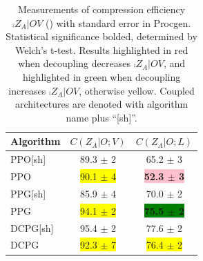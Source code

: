 \begin{table}[!h]
\caption{Measurements of compression efficiency $\comp{Z_A \vert O}{V}$ () with standard error in Procgen. Statistical significance bolded, determined by Welch's t-test. Results highlighted in red when decoupling decreases $\comp{Z_A \vert O}{V}$, and highlighted in green when decoupling increases $\comp{Z_A \vert O}{V}$, otherwise yellow. Coupled architectures are denoted with algorithm name plus ``[sh]''.}
\label{c2:tab:decoupled-C}
\begin{center}
\begin{tabular}{l|c|c}
\textbf{Algorithm} & $C(Z_A \vert O;V)$ & $C(Z_A \vert O;L)$
\\ \hline
PPO[sh] & 89.3 $\pm$ 2 & 65.2 $\pm$ 3 \\
PPO & \colorbox{yellow}{90.1 $\pm$ 4} & \textbf{\colorbox{pink}{52.3 $\pm$ 3}} \\ \hline
PPG[sh] & 85.9 $\pm$ 4 & 70.0 $\pm$ 2 \\
PPG & \colorbox{yellow}{94.1 $\pm$ 2} & \textbf{\colorbox{green}{75.5 $\pm$ 2}} \\ \hline
DCPG[sh] & 95.4 $\pm$ 2 & 77.6 $\pm$ 2 \\
DCPG & \colorbox{yellow}{92.3 $\pm$ 7} & \colorbox{yellow}{76.4 $\pm$ 2}
\end{tabular}
\end{center}
\end{table}

